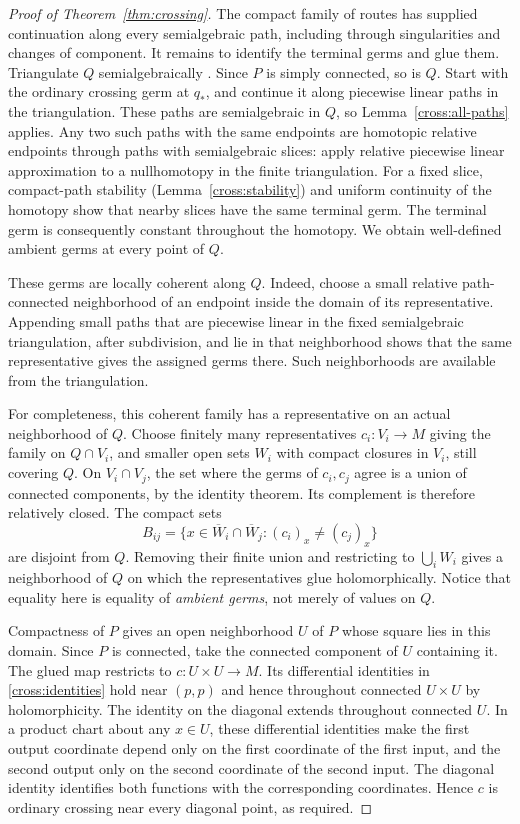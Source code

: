\begin{proof}[Proof of Theorem~\ref{thm:crossing}]
The compact family of routes has supplied continuation along every
semialgebraic path, including through singularities and changes of
component. It remains to identify the terminal germs and glue them.
Triangulate \(Q\) semialgebraically
\cite[Theorem~4.4]{Coste99}. Since \(P\) is simply connected,
so is \(Q\). Start with the ordinary crossing germ at \(q_*\), and
continue it along piecewise linear paths in the triangulation. These
paths are semialgebraic in \(Q\), so Lemma~\ref{cross:all-paths}
applies. Any two such paths with the same endpoints are homotopic
relative endpoints through paths with semialgebraic slices: apply
relative piecewise linear approximation to a nullhomotopy in the
finite triangulation. For a fixed slice, compact-path stability
(Lemma~\ref{cross:stability}) and uniform continuity of the homotopy
show that nearby slices have the same terminal germ. The terminal
germ is consequently constant throughout the homotopy. We obtain
well-defined ambient germs at every point of \(Q\).

These germs are locally coherent along \(Q\). Indeed, choose a small
relative path-connected neighborhood of an endpoint inside the domain
of its representative. Appending small paths that are piecewise linear in the fixed
semialgebraic triangulation, after subdivision, and lie in that
neighborhood shows that the same representative gives the assigned
germs there. Such neighborhoods are available from the triangulation.

For completeness, this coherent family has a representative on an
actual neighborhood of \(Q\). Choose finitely many representatives
\(c_i:V_i\to M\) giving the family on \(Q\cap V_i\), and smaller open
sets \(W_i\) with compact closures in \(V_i\), still covering \(Q\).
On \(V_i\cap V_j\), the set where the germs of \(c_i,c_j\) agree is
a union of connected components, by the identity theorem. Its
complement is therefore relatively closed. The compact sets
\[
 B_{ij}=\{x\in\overline W_i\cap\overline W_j:
                 (c_i)_x\ne(c_j)_x\}
\]
are disjoint from \(Q\). Removing their finite union and restricting
to \(\bigcup_iW_i\) gives a neighborhood of \(Q\) on which the
representatives glue holomorphically. Notice that equality here is
equality of \emph{ambient germs}, not merely of values on \(Q\).

Compactness of \(P\) gives an open neighborhood \(U\) of \(P\) whose
square lies in this domain. Since \(P\) is connected, take the connected
component of \(U\) containing it. The glued map restricts to
\(c:U\times U\to M\). Its differential identities in
\eqref{cross:identities} hold near \((p,p)\) and hence throughout
connected \(U\times U\) by holomorphicity. The identity on the diagonal
extends throughout connected \(U\). In a product chart about any
\(x\in U\), these differential identities make the first output
coordinate depend only on the first coordinate of the first input,
and the second output only on the second coordinate of the second
input. The diagonal identity identifies both functions with the
corresponding coordinates. Hence \(c\) is ordinary crossing near every
diagonal point, as required.
\end{proof}

